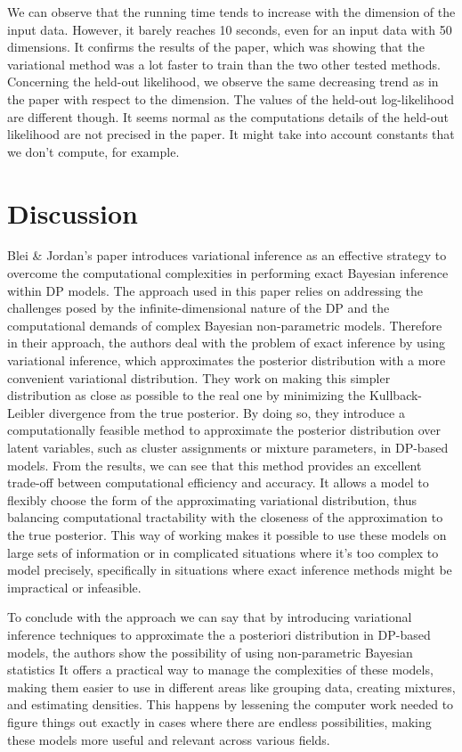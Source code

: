 \documentclass{article}
\begin{document}
We can observe that the running time tends to increase with the dimension of the input data. However, it barely reaches 10 seconds, even for an input data with 50 dimensions. It confirms the results of the paper, which was showing that the variational method was a lot faster to train than the two other tested methods. \\
Concerning the held-out likelihood, we observe the same decreasing trend as in the paper with respect to the dimension. The values of the held-out log-likelihood are different though. It seems normal as the computations details of the held-out likelihood are not precised in the paper. It might take into account constants that we don't compute, for example.


\section{Discussion}

Blei \& Jordan's paper introduces variational inference as an effective strategy to overcome the computational complexities in performing exact Bayesian inference within DP models. The approach used in this paper relies on addressing the challenges posed by the infinite-dimensional nature of the DP and the computational demands of complex Bayesian non-parametric models. Therefore in their approach, the authors deal with the problem of exact inference by using variational inference, which approximates the posterior distribution with a more convenient variational distribution. They work on making this simpler distribution as close as possible to the real one by minimizing the Kullback-Leibler divergence from the true posterior. By doing so, they introduce a computationally feasible method to approximate the posterior distribution over latent variables, such as cluster assignments or mixture parameters, in DP-based models. From the results, we can see that this method provides an excellent trade-off between computational efficiency and accuracy. It allows a model to flexibly choose the form of the approximating variational distribution, thus balancing computational tractability with the closeness of the approximation to the true posterior. This way of working makes it possible to use these models on large sets of information or in complicated situations where it's too complex to model precisely, specifically in situations where exact inference methods might be impractical or infeasible.

To conclude with the approach we can say that by introducing variational inference techniques to approximate the a posteriori distribution in DP-based models, the authors show the possibility of using non-parametric Bayesian statistics It offers a practical way to manage the complexities of these models, making them easier to use in different areas like grouping data, creating mixtures, and estimating densities. This happens by lessening the computer work needed to figure things out exactly in cases where there are endless possibilities, making these models more useful and relevant across various fields.
\end{document}
